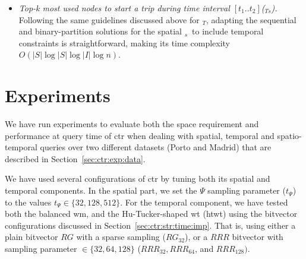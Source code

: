 \begin{itemize}
\begin{itemize}
	\end{itemize}


	\item {\em Top-k most used nodes to start a trip during time interval $[t_1..t_2]$(\topK$_{Ts}$).}
	Following the same guidelines discussed above for \topK$_T$, adapting the  sequential and 
	binary-partition solutions for the spatial \topK$_s$\ to include temporal constraints is straightforward, making its time complexity $O(|S|\log|S|\log|I|\log n)$.
	\end{itemize}


\section{Experiments}
\label{sec:ctr:exp}
	We have run experiments to evaluate both the space requirement and performance at query time of \gls{ctr}
	when dealing with spatial, temporal and spatio-temporal queries over two different datasets 
	(Porto and Madrid) that are described in Section~\ref{sec:ctr:exp:data}. 

	We have used several configurations of \gls{ctr} by tuning both its
	spatial and temporal components. In the spatial part, %
	we set the  $\Psi$ sampling parameter ($t_{\Psi}$) to the values $t_{\Psi} \in \{32, 128, 512\}$. 
	For the temporal component, %
	we have tested both the 
	balanced \gls{wm}, and the Hu-Tucker-shaped \gls{wt} (\gls{htwt}) using the bitvector configurations
	discussed in Section~\ref{sec:ctr:str:time:imp}. That is, using either a plain bitvector $RG$ with a 
	sparse sampling ($RG_{32}$), or a $RRR$ bitvector with sampling parameter $\in \{32,64,128\}$ 
	($RRR_{32}, RRR_{64}$, and $ RRR_{128})$.


